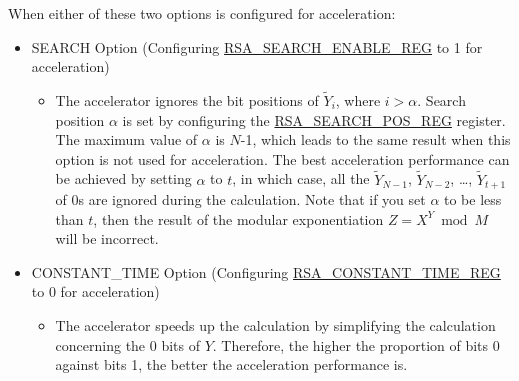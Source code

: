 \documentclass[main\_\_EN.tex]{subfiles}
\begin{document}
When either of these two options is configured for acceleration:

\begin{itemize}
 \item SEARCH Option (Configuring \hyperref[regdesc:RSASEARCHENABLEREG]{RSA\_SEARCH\_ENABLE\_REG} to 1 for acceleration)
    \begin{itemize}
        \item The accelerator ignores the bit positions of \begin{math} \widetilde{Y}_{i} \end{math}, where \begin{math} i > \alpha \end{math}. Search position \begin{math} \alpha \end{math} is set by configuring the \hyperref[regdesc:RSASEARCHPOSREG]{RSA\_SEARCH\_POS\_REG} register. The maximum value of \begin{math} \alpha \end{math} is \begin{math}N\end{math}-1, which leads to the same result when this option is not used for acceleration. The best acceleration performance can be achieved by setting \begin{math} \alpha \end{math} to \begin{math} t \end{math}, in which case, all the \begin{math}\widetilde{Y}_{N-1}\end{math}, \begin{math}\widetilde{Y}_{N-2}\end{math}, \dots, \begin{math}\widetilde{Y}_{t+1}\end{math} of 0s are ignored during the calculation. Note that if you set \begin{math} \alpha \end{math} to be less than \begin{math} t \end{math}, then the result of the modular exponentiation \begin{math}Z = X^{Y} \bmod M \end{math} will be incorrect.
    \end{itemize}  
\item CONSTANT\_TIME Option (Configuring \hyperref[regdesc:RSACONSTANTTIMEREG]{RSA\_CONSTANT\_TIME\_REG} to 0 for acceleration)
    \begin{itemize}
        \item The accelerator speeds up the calculation by simplifying the calculation concerning the 0 bits of \begin{math} Y \end{math}. Therefore, the higher the proportion of bits 0 against bits 1, the better the acceleration performance is.
    \end{itemize}
\end{itemize}
\end{document}
